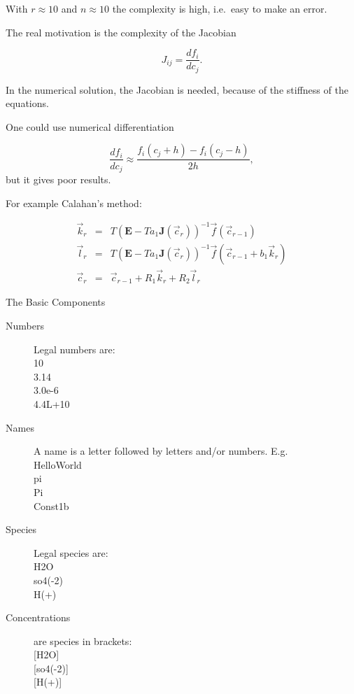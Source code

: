 With $r\approx 10$ and $n\approx 10$ the complexity is high, i.e.\ easy
to make an error.

\vspace{2cm}
The real motivation is the complexity of the Jacobian

\[
  J_{ij} = \frac{df_i}{dc_j}.
\]

In the numerical solution, the Jacobian is needed, because of the stiffness
of the equations. 

One could use numerical differentiation

\[
  \frac{df_i}{dc_j} \approx \frac{f_i(c_j+h)-f_i(c_j-h)}{2h},
\]
but it gives poor results.

For example Calahan's method:

\begin{eqnarray*}
\vec{k}_r &=& T({\mathbf E} - Ta_1 {\mathbf J}(\vec{c}_r))^{-1}\vec{f}(\vec{c}_{r-1}) \\
\vec{l}_r &=& T({\mathbf E} - Ta_1 {\mathbf J}(\vec{c}_r))^{-1}\vec{f}(\vec{c}_{r-1}+b_1\vec{k}_r) \\
\vec{c}_r &=& \vec{c}_{r-1} + R_1\vec{k}_r + R_2\vec{l}_r
\end{eqnarray*}

\newpage
\begin{center}
The Basic Components
\end{center}

\vspace{1cm}
\begin{description}
  \item[Numbers] Legal numbers are:\\
    10 \\
    3.14 \\
    3.0e-6 \\
    4.4L+10
  \item[Names] A name is a letter followed by letters and/or numbers. E.g.\ \\
    HelloWorld \\
    pi \\
    Pi \\
    Const1b 
  \item[Species] Legal species are: \\
    H2O \\
    so4(-2) \\
    H(+) 
  \item[Concentrations] are species in brackets: \\
    {\rm [}H2O{\rm ]} \\
    {\rm [}so4(-2){\rm ]} \\
    {\rm [}H(+){\rm ]}
\end{description}

